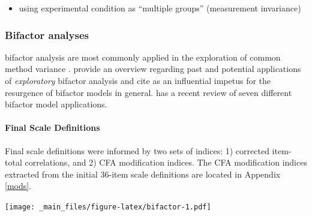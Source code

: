 \documentclass[
]{book}
\providecommand{\tightlist}{%
  \setlength{\itemsep}{0pt}\setlength{\parskip}{0pt}}
\begin{document}
\begin{itemize}
\tightlist
\item
  using experimental condition as ``multiple groups'' (measurement invariance)
\end{itemize}

\hypertarget{bifactor-analyses}{%
\subsubsection{Bifactor analyses}\label{bifactor-analyses}}

bifactor analysis are most commonly applied in the exploration of common method variance \citep[see, for example,][]{reise_rediscovery_2012, rodriguez_evaluating_2016}. \citet{giordano_exploratory_2020} provide an overview regarding past and potential applications of \emph{exploratory} bifactor analysis and cite \citet{reise_rediscovery_2012} as an influential impetus for the resurgence of bifactor models in general. \citet{giordano2020recovering} has a recent review of seven different bifactor model applications.

\hypertarget{final-scale-definitions}{%
\paragraph{Final Scale Definitions}\label{final-scale-definitions}}

Final scale definitions were informed by two sets of indices: 1) corrected item-total correlations, and 2) CFA modification indices. The CFA modification indices extracted from the initial 36-item scale definitions are located in Appendix \ref{mods}.

\texttt{[image: \_main\_files/figure-latex/bifactor-1.pdf]}
\end{document}
